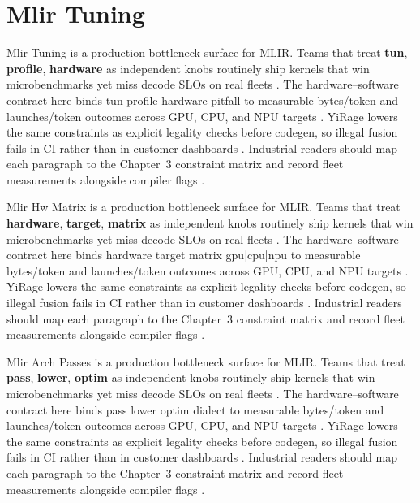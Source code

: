 \section{Mlir Tuning}
\label{sec:mlir_tuning}

Mlir Tuning is a production bottleneck surface for MLIR. Teams that treat \textbf{tun}, \textbf{profile}, \textbf{hardware} as independent knobs routinely ship kernels that win microbenchmarks yet miss decode SLOs on real fleets \citep{nvidia2022hopper,amd2024aie}. The hardware--software contract here binds tun profile hardware pitfall to measurable bytes/token and launches/token outcomes across GPU, CPU, and NPU targets \citep{semianalysis2024tma,dlbook}. YiRage lowers the same constraints as explicit legality checks before codegen, so illegal fusion fails in CI rather than in customer dashboards \citep{amd2024xdna,dao2022flashattention}. Industrial readers should map each paragraph to the Chapter~3 constraint matrix and record fleet measurements alongside compiler flags \citep{amd2024aie,kwon2023vllm}.

Mlir Hw Matrix is a production bottleneck surface for MLIR. Teams that treat \textbf{hardware}, \textbf{target}, \textbf{matrix} as independent knobs routinely ship kernels that win microbenchmarks yet miss decode SLOs on real fleets \citep{taxbreak2026,semianalysis2024tma}. The hardware--software contract here binds hardware target matrix gpu|cpu|npu to measurable bytes/token and launches/token outcomes across GPU, CPU, and NPU targets \citep{memoryfloor2026,amd2024xdna}. YiRage lowers the same constraints as explicit legality checks before codegen, so illegal fusion fails in CI rather than in customer dashboards \citep{nvidia2022hopper,amd2024aie}. Industrial readers should map each paragraph to the Chapter~3 constraint matrix and record fleet measurements alongside compiler flags \citep{semianalysis2024tma,dlbook}.

Mlir Arch Passes is a production bottleneck surface for MLIR. Teams that treat \textbf{pass}, \textbf{lower}, \textbf{optim} as independent knobs routinely ship kernels that win microbenchmarks yet miss decode SLOs on real fleets \citep{memoryfloor2026,amd2024xdna}. The hardware--software contract here binds pass lower optim dialect to measurable bytes/token and launches/token outcomes across GPU, CPU, and NPU targets \citep{nvidia2022hopper,amd2024aie}. YiRage lowers the same constraints as explicit legality checks before codegen, so illegal fusion fails in CI rather than in customer dashboards \citep{semianalysis2024tma,dlbook}. Industrial readers should map each paragraph to the Chapter~3 constraint matrix and record fleet measurements alongside compiler flags \citep{amd2024xdna,dao2022flashattention}.

